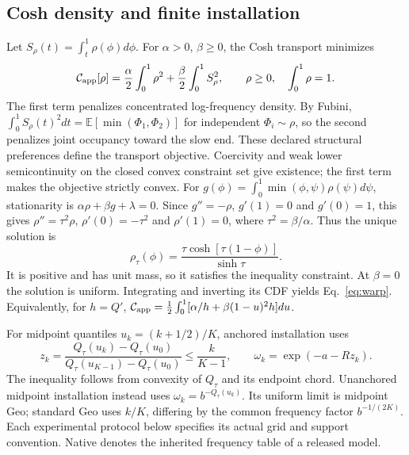\subsection{Cosh density and finite installation}
\label{sec:proofs}\label{sec:table-identities}
Let $S_\rho(t)=\int_t^1\rho(\phi)d\phi$. For $\alpha>0$, $\beta\ge0$, the
Cosh transport minimizes
\begin{equation}
\mathcal{C}_{\mathrm{app}}[\rho]=\frac\alpha2\int_0^1\rho^2+
\frac\beta2\int_0^1 S_\rho^2,\qquad \rho\ge0,\quad\int_0^1\rho=1.
\label{eq:Capp}
\end{equation}
The first term penalizes concentrated log-frequency density. By Fubini,
$\int_0^1S_\rho(t)^2dt=\mathbb E[\min(\Phi_1,\Phi_2)]$ for independent
$\Phi_i\sim\rho$, so the second penalizes joint occupancy toward the slow
end. These declared structural preferences define the transport objective.
Coercivity and weak lower semicontinuity on the closed convex constraint set
give existence; the first term makes the objective strictly convex. For
$g(\phi)=\int_0^1\min(\phi,\psi)\rho(\psi)d\psi$, stationarity is
$\alpha\rho+\beta g+\lambda=0$. Since $g''=-\rho$, $g'(1)=0$ and
$g'(0)=1$, this gives $\rho''=\tau^2\rho$, $\rho'(0)=-\tau^2$ and
$\rho'(1)=0$, where $\tau^2=\beta/\alpha$. Thus the unique solution is
\begin{equation}
\rho_\tau(\phi)=\frac{\tau\cosh[\tau(1-\phi)]}{\sinh\tau}.
\label{eq:rho-tau-closed}
\end{equation}
It is positive and has unit mass, so it satisfies the inequality constraint.
At $\beta=0$ the solution is uniform. Integrating and inverting its CDF yields
Eq.~\eqref{eq:warp}. Equivalently, for $h=Q'$,
$\mathcal{C}_{\mathrm{app}}=\tfrac12\int_0^1[\alpha/h+\beta(1-u)^2h]du$.

For midpoint quantiles $u_k=(k+1/2)/K$, anchored installation uses
\begin{equation}
z_k=\frac{Q_\tau(u_k)-Q_\tau(u_0)}{Q_\tau(u_{K-1})-Q_\tau(u_0)}
\le\frac{k}{K-1},\qquad \omega_k=\exp(-a-Rz_k).
\label{eq:anchored-cosh-order}
\end{equation}
The inequality follows from convexity of $Q_\tau$ and its endpoint chord.
Unanchored midpoint installation instead uses $\omega_k=b^{-Q_\tau(u_k)}$.
Its uniform limit is midpoint Geo; standard Geo uses $k/K$, differing by the
common frequency factor $b^{-1/(2K)}$. Each experimental protocol below
specifies its actual grid and support convention. Native denotes the inherited
frequency table of a released model.
